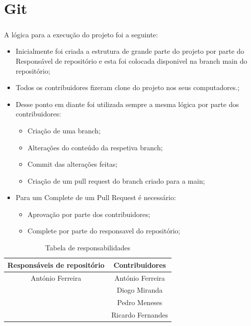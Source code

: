 \chapter*{\thechapter \quad Git}
\paragraph{}

A lógica para a execução do projeto foi a seguinte:
\begin{itemize}
    \item Inicialmente foi criada a estrutura de grande parte do projeto por parte do Responsável de repositório e esta foi colocada disponivel na branch main do repositório;
    \item Todos os contribuidores fizeram clone do projeto nos seus computadores.;
    \item Desse ponto em diante foi utilizada sempre a mesma lógica por parte dos contribuidores:
    \begin{itemize}
    \item Criação de uma branch;
    \item Alterações do conteúdo da respetiva branch;
    \item Commit das alterações feitas;
    \item Criação de um pull request do branch criado para a main;
    \end{itemize}
    
    \item Para um Complete de um Pull Request é necessário:
    \begin{itemize}
    \item Aprovação por parte dos contribuidores;
    \item Complete por parte do responsavel do repositório;
    \end{itemize}
\end{itemize}

\begin{table}
\begin{center}
\begin{tabular}{||c c||} 
 \hline
 Responsáveis de repositório & Contribuidores  \\ [0.5ex] 
 \hline\hline
 António Ferreira & António Ferreira \\ 
 \hline
  & Diogo Miranda \\
 \hline
  & Pedro Meneses \\
 \hline
  & Ricardo Fernandes \\ [1ex] 
 \hline
\end{tabular}
\caption{Tabela de responsabilidades}
\label{table: Tabela de responsabilidades}
\end{center}
\end{table}



